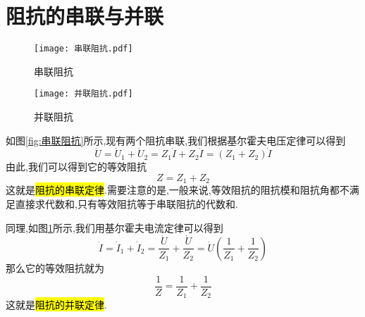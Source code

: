 \section{\K 阻抗的串联与并联}
\begin{figure}[htbp]
	\centering
	\begin{minipage}[b]{0.45\textwidth}
        \centering
        \texttt{[image: 串联阻抗.pdf]}
        \caption{串联阻抗}
        \label{fig:串联阻抗}
    \end{minipage}
    \begin{minipage}[b]{0.45\textwidth}
        \centering
        \texttt{[image: 并联阻抗.pdf]}
        \caption{并联阻抗}
        \label{fig:并联阻抗}
    \end{minipage}
\end{figure}
\Par 如图\ref{fig:串联阻抗}所示,现有两个阻抗串联,我们根据基尔霍夫电压定律可以得到
\begin{equation}
    \dot{U}=\dot{U}_1+\dot{U}_2=Z_1\dot{I}+Z_2\dot{I}=\left( Z_1+Z_2 \right) \dot{I}
\end{equation}
由此,我们可以得到它的等效阻抗
\begin{equation}
    Z=Z_1+Z_2
\end{equation}
这就是\hl{阻抗的串联定律}.需要注意的是,一般来说,等效阻抗的阻抗模和阻抗角都不满足直接求代数和,只有等效阻抗等于串联阻抗的代数和.

\Par 同理,如图\ref{fig:并联阻抗}所示,我们用基尔霍夫电流定律可以得到
\begin{equation}
    \dot{I}=\dot{I}_1+\dot{I}_2=\frac{\dot{U}}{Z_1}+\frac{\dot{U}}{Z_2}=\dot{U}\left( \frac{1}{Z_1}+\frac{1}{Z_2} \right) 
\end{equation}
那么它的等效阻抗就为
\begin{equation}
    \frac{1}{Z}=\frac{1}{Z_1}+\frac{1}{Z_2}
\end{equation}
这就是\hl{阻抗的并联定律}.
